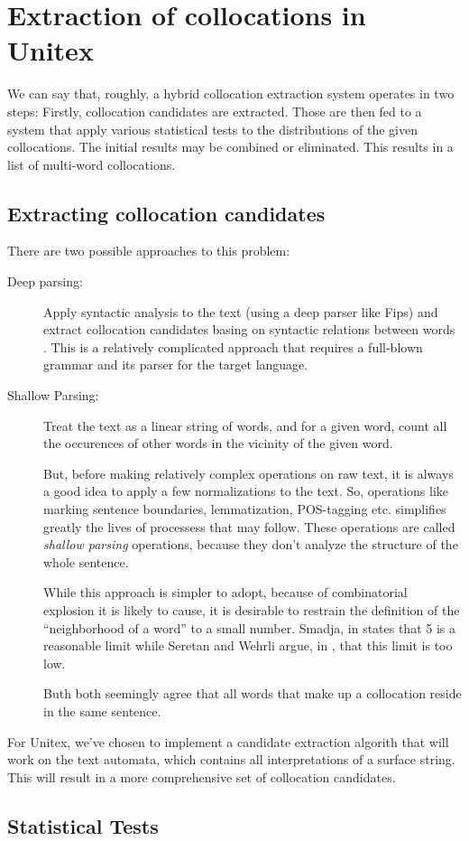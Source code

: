 \documentclass[a4paper,12pt,oneside]{article}
\begin{document}
\section{Extraction of collocations in Unitex}
We can say that, roughly, a hybrid collocation extraction system operates in two
steps: Firstly, collocation candidates are extracted. Those are then fed to a
system that apply various statistical tests to the distributions of the given
collocations. The initial results may be combined or eliminated. This results in
a list of multi-word collocations.

\subsection{Extracting collocation candidates}
There are two possible approaches to this problem: 

\begin{description}
\item[Deep parsing:] Apply syntactic analysis to the text (using a deep parser
like Fips\cite{fips2007}) and extract collocation candidates basing on syntactic
relations between words \cite{SeretanWehrli2006ACL}. This is a relatively
complicated approach that requires a full-blown grammar and its parser for the
target language.

\item[Shallow Parsing:] Treat the text as a linear string of words, and for a
given word, count all the occurences of other words in the vicinity of the given
word. 

But, before making relatively complex operations on raw text, it is always a
good idea to apply a few normalizations to the text. So, operations like marking
sentence boundaries, lemmatization, POS-tagging etc. simplifies greatly the
lives of processess that may follow\cite{smadja93}. These operations are called
\emph{shallow parsing} operations, because they don't analyze the structure of
the whole sentence.

While this approach is simpler to adopt, because of combinatorial explosion it
is likely to cause, it is desirable to restrain the definition of the
``neighborhood of a word'' to a small number. Smadja, in \cite{smadja93} states
that 5 is a reasonable limit while Seretan and Wehrli argue, in
\cite{SeretanWehrli2006ACL}, that this limit is too low. 

Buth both seemingly agree that all words that make up a collocation reside in
the same sentence.

\end{description}

For Unitex, we've chosen to implement a candidate extraction algorith that will
work on the text automata, which contains all interpretations of a surface string.
This will result in a more comprehensive set of collocation candidates.

\subsection{Statistical Tests}


\end{document}
